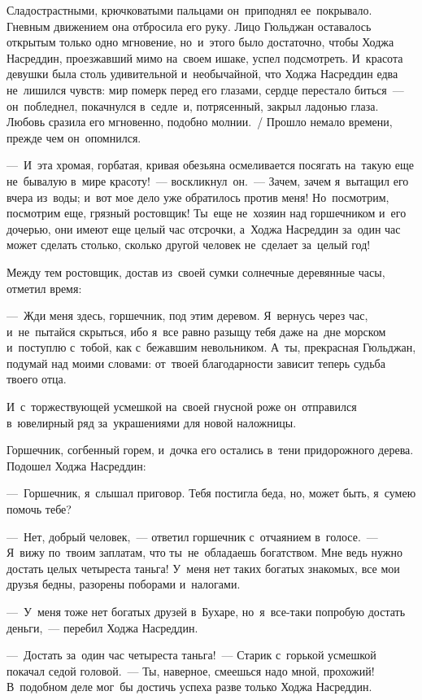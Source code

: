 \documentclass[12pt,a4paper]{book}
\begin{document}
Сладострастными, крючковатыми пальцами он~приподнял ее~покрывало. Гневным движением она отбросила его руку. Лицо Гюльджан оставалось открытым только одно мгновение, но~и~этого было достаточно, чтобы Ходжа Насреддин, проезжавший мимо на~своем ишаке, успел подсмотреть. И~красота девушки была столь удивительной и~необычайной, что Ходжа Насреддин едва не~лишился чувств: мир померк перед его глазами, сердце перестало биться~— он~побледнел, покачнулся в~седле~и, потрясенный, закрыл ладонью глаза. Любовь сразила его мгновенно, подобно молнии.~/ Прошло немало времени, прежде чем он~опомнился.

—~И~эта хромая, горбатая, кривая обезьяна осмеливается посягать на~такую еще не~бывалую в~мире красоту!~— воскликнул~он.~— Зачем, зачем я~вытащил его вчера из~воды; и~вот мое дело уже обратилось против меня! Но~посмотрим, посмотрим еще, грязный ростовщик! Ты~еще не~хозяин над горшечником и~его дочерью, они имеют еще целый час отсрочки, а~Ходжа Насреддин за~один час может сделать столько, сколько другой человек не~сделает за~целый год!

Между тем ростовщик, достав из~своей сумки солнечные деревянные часы, отметил время:

—~Жди меня здесь, горшечник, под этим деревом. Я~вернусь через час, и~не~пытайся скрыться, ибо я~все равно разыщу тебя даже на~дне морском и~поступлю с~тобой, как с~бежавшим невольником. А~ты, прекрасная Гюльджан, подумай над моими словами: от~твоей благодарности зависит теперь судьба твоего отца.

И~с~торжествующей усмешкой на~своей гнусной роже он~отправился в~ювелирный ряд за~украшениями для новой наложницы.

Горшечник, согбенный горем, и~дочка его остались в~тени придорожного дерева. Подошел Ходжа Насреддин:

—~Горшечник, я~слышал приговор. Тебя постигла беда, но, может быть, я~сумею помочь тебе?

—~Нет, добрый человек,~— ответил горшечник с~отчаянием в~голосе.~— Я~вижу по~твоим заплатам, что ты~не~обладаешь богатством. Мне ведь нужно достать целых четыреста таньга! У~меня нет таких богатых знакомых, все мои друзья бедны, разорены поборами и~налогами.

—~У~меня тоже нет богатых друзей в~Бухаре, но~я~все-таки попробую достать деньги,~— перебил Ходжа Насреддин.

—~Достать за~один час четыреста таньга!~— Старик с~горькой усмешкой покачал седой головой.~— Ты, наверное, смеешься надо мной, прохожий! В~подобном деле мог~бы достичь успеха разве только Ходжа Насреддин.
\end{document}
